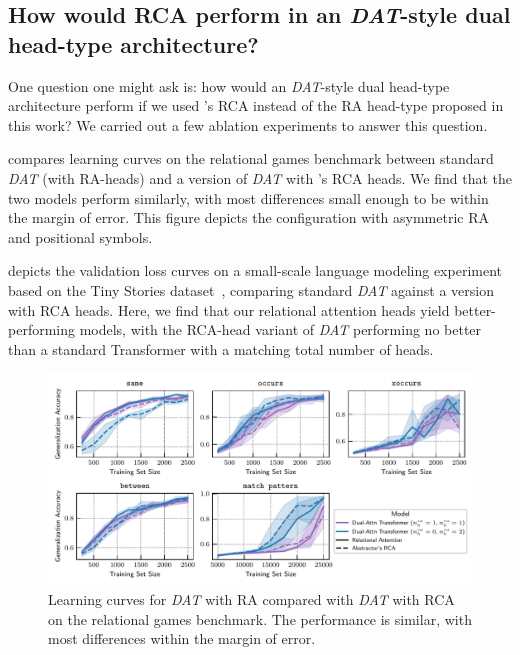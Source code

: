 \subsection{How would RCA perform in an \textit{DAT}-style dual head-type architecture?}

One question one might ask is: how would an \textit{DAT}-style dual head-type architecture perform if we used \citet{altabaa2024abstractors}'s RCA instead of the RA head-type proposed in this work? We carried out a few ablation experiments to answer this question.

 compares learning curves on the relational games benchmark between standard \textit{DAT} (with RA-heads) and a version of \textit{DAT} with \citet{altabaa2024abstractors}'s RCA heads. We find that the two models perform similarly, with most differences small enough to be within the margin of error. This figure depicts the configuration with asymmetric RA and positional symbols.

 depicts the validation loss curves on a small-scale language modeling experiment based on the Tiny Stories dataset~\citep{eldanTinyStoriesHowSmall2023}, comparing standard \textit{DAT} against a version with RCA heads. Here, we find that our relational attention heads yield better-performing models, with the RCA-head variant of \textit{DAT} performing no better than a standard Transformer with a matching total number of heads.

\begin{figure}[ht]
    \includegraphics[width=\textwidth]{figs/experiments/relgames/relgames_learning_curves_rcatype_ablation.pdf}
    \caption{Learning curves for \textit{DAT} with RA compared with \textit{DAT} with RCA on the relational games benchmark. The performance is similar, with most differences within the margin of error.}\label{fig:relgames_ratype_ablation}
\end{figure}

